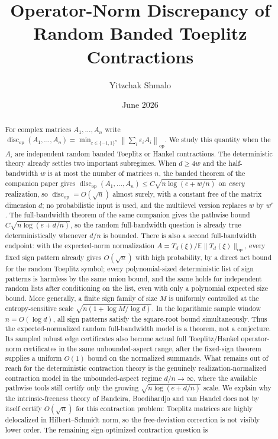 \documentclass[11pt]{amsart}
\title[Operator-norm discrepancy of random Toeplitz contractions]{Operator-Norm Discrepancy of Random Banded Toeplitz Contractions}
\author{Yitzchak Shmalo}
\date{June 2026}
\numberwithin{equation}{section}
\theoremstyle{definition}
\theoremstyle{remark}
\newcommand{\op}{\mathrm{op}}
\newcommand{\discop}{\operatorname{disc}_{\op}}
\newcommand{\Exp}{\mathbb E}
\newcommand{\norm}[1]{\left\lVert #1\right\rVert}
\newcommand{\eps}{\varepsilon}
\begin{document}
\begin{abstract}
For complex matrices $A_1,\ldots,A_n$ write
$\discop(A_1,\ldots,A_n)=\min_{\eps\in\{-1,1\}^n}\norm{\sum_i\eps_iA_i}_{\op}$.
We study this quantity when the $A_i$ are independent random banded Toeplitz or
Hankel contractions. The deterministic theory already settles two important
subregimes. When \(d\ge4w\) and the half-bandwidth \(w\)
is at most the number of matrices $n$, the banded theorem of the
companion paper \cite{Shmalo-paper12} gives
$\discop(A_1,\ldots,A_n)\le C\sqrt{n\log(e+w/n)}$ on \emph{every} realization, so
$\discop=O(\sqrt n)$ almost surely, with a constant free of the matrix dimension
$d$; no probabilistic input is used, and the multilevel version replaces $w$ by
$w^r$. The full-bandwidth theorem of the same companion gives the pathwise bound
\(C\sqrt{n\log(e+d/n)}\), so the random full-bandwidth question is already
true deterministically whenever \(d/n\) is bounded.  There is also a second
full-bandwidth endpoint: with the expected-norm normalization
\(A=T_d(\xi)/\Exp\|T_d(\xi)\|_{\op}\), every fixed sign pattern already gives
\(O(\sqrt n)\) with high probability, by a direct net bound for the random
Toeplitz symbol; every polynomial-sized deterministic list of sign patterns is
harmless by the same union bound, and the same holds for independent random
lists after conditioning on the list, even with only a polynomial expected
size bound.  More generally, a finite sign family of size \(M\) is uniformly
controlled at the entropy-sensitive scale
\(\sqrt{n(1+\log M/\log d)}\).  In the logarithmic sample window \(n=O(\log d)\),
all sign patterns satisfy the square-root bound simultaneously. Thus the
expected-normalized random full-bandwidth model is a theorem, not a conjecture.
Its sampled robust edge certificates also become actual full Toeplitz/Hankel
operator-norm certificates in the same unbounded-aspect range, after the
fixed-sign theorem supplies a uniform \(O(1)\) bound on the normalized summands.
What remains out of reach for the deterministic
contraction theory is the genuinely realization-normalized contraction model in
the unbounded-aspect regime \(d/n\to\infty\), where the available pathwise tools
still certify only the growing \(\sqrt{n\log(e+d/n)}\) scale.  We explain why the
intrinsic-freeness theory of Bandeira, Boedihardjo and van Handel does not by
itself certify \(O(\sqrt n)\) for this contraction problem: Toeplitz matrices are
highly delocalized in Hilbert--Schmidt norm, so the free-deviation correction is
not visibly lower order. The remaining sign-optimized contraction question is

\end{abstract}
\end{document}
